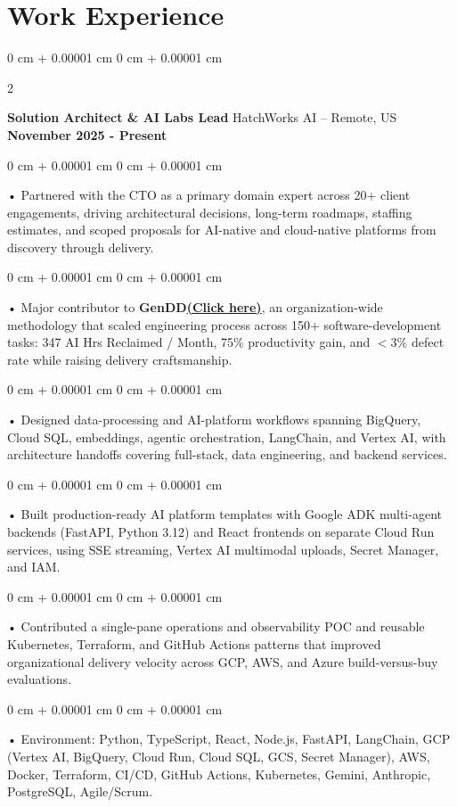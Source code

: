 \documentclass[10pt, letterpaper]{article}
\newenvironment{onecolentry}{
    \begin{adjustwidth}{
        0 cm + 0.00001 cm
    }{
        0 cm + 0.00001 cm
    }
}{
    \end{adjustwidth}
} %
\newenvironment{twocolentry}[2][]{
    \onecolentry
    \def\secondColumn{#2}
    \setcolumnwidth{\fill, 4.5 cm}
    \begin{paracol}{2}
}{
    \switchcolumn \raggedleft \secondColumn
    \end{paracol}
    \endonecolentry
} %
\begin{document}
    \vspace{0.5cm}
    \section{Work Experience}
        \vspace{0.1cm}

        \begin{twocolentry}{
            \textbf{November 2025 - Present}
        }
            \textbf{Solution Architect \& AI Labs Lead} HatchWorks AI -- Remote, US\end{twocolentry}

        \begin{onecolentry}
             • Partnered with the CTO as a primary domain expert across 20+ client engagements, driving architectural decisions, long-term roadmaps, staffing estimates, and scoped proposals for AI-native and cloud-native platforms from discovery through delivery.
        \end{onecolentry}
        \begin{onecolentry}
             • Major contributor to \textbf{GenDD}\href{https://hatchworks.com/generative-driven-development/}{\textbf{(Click here)}}, an organization-wide methodology that scaled engineering process across 150+ software-development tasks: 347 AI Hrs Reclaimed / Month, 75\% productivity gain, and $<$3\% defect rate while raising delivery craftsmanship.
        \end{onecolentry}
        \begin{onecolentry}
             • Designed data-processing and AI-platform workflows spanning BigQuery, Cloud SQL, embeddings, agentic orchestration, LangChain, and Vertex AI, with architecture handoffs covering full-stack, data engineering, and backend services.
        \end{onecolentry}
        \begin{onecolentry}
             • Built production-ready AI platform templates with Google ADK multi-agent backends (FastAPI, Python 3.12) and React frontends on separate Cloud Run services, using SSE streaming, Vertex AI multimodal uploads, Secret Manager, and IAM.
        \end{onecolentry}
        \begin{onecolentry}
             • Contributed a single-pane operations and observability POC and reusable Kubernetes, Terraform, and GitHub Actions patterns that improved organizational delivery velocity across GCP, AWS, and Azure build-versus-buy evaluations.
        \end{onecolentry}
        \begin{onecolentry}
             • Environment: Python, TypeScript, React, Node.js, FastAPI, LangChain, GCP (Vertex AI, BigQuery, Cloud Run, Cloud SQL, GCS, Secret Manager), AWS, Docker, Terraform, CI/CD, GitHub Actions, Kubernetes, Gemini, Anthropic, PostgreSQL, Agile/Scrum.
        \end{onecolentry}
\end{document}
